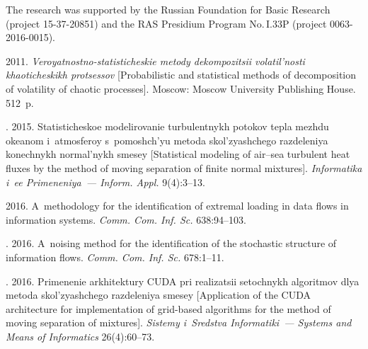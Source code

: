 

\Ack
\noindent
The research was supported by the Russian Foundation for Basic Research 
(project 15-37-20851) and the RAS Presidium Program No.\,I.33P (project 0063-2016-0015). 

 

\vspace*{6pt}

  \begin{multicols}{2}

\renewcommand{\bibname}{\protect\rmfamily References}

{\small\frenchspacing
 {%
 \begin{thebibliography}{99}

 2011. 
\textit{Veroyatnostno-statisticheskie metody dekompozitsii volatil'nosti 
khaoticheskikh protsessov} [Probabilistic and statistical methods of decomposition 
of volatility of chaotic processes]. Moscow: Moscow University Publishing House. 512~p.

. 2015. 
Statisticheskoe modelirovanie turbulentnykh potokov tepla mezhdu okeanom i~at\-mo\-sfe\-roy 
s~pomoshch'yu metoda skol'zyashchego razdeleniya konechnykh normal'nykh smesey 
[Statistical modeling of air--sea turbulent heat fluxes by the method of 
moving separation of finite normal mixtures]. 
\textit{Informatika i~ee Primeneniya~---  Inform. Appl.} 9(4):3--13.

 2016. 
A~methodology for the identification of extremal loading in data flows 
in information systems. \textit{Comm. Com. Inf. Sc.} 638:94--103.

. 2016. A~noising method for the 
identification of the stochastic structure of information flows. 
\textit{Comm. Com. Inf. Sc.} 678:1--11.

. 2016. Primenenie arkhitektury CUDA 
pri realizatsii setochnykh algoritmov dlya metoda skol'zyashchego razdeleniya 
smesey [Application of the CUDA architecture for implementation of grid-based 
algorithms for the method of moving separation of mixtures]. 
\textit{Sistemy i~Sredstva Informatiki~--- Systems and Means of Informatics} 26(4):60--73.


\end{thebibliography}}}
\end{multicols}
